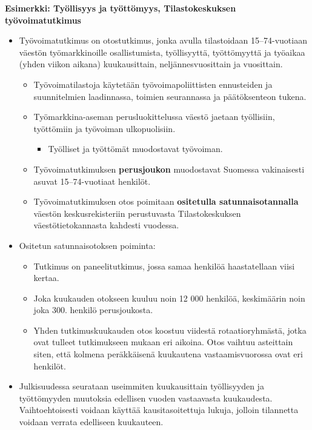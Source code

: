 \documentclass[
]{book}
\providecommand{\tightlist}{%
  \setlength{\itemsep}{0pt}\setlength{\parskip}{0pt}}
\begin{document}
\begin{eblock}{}

\textbf{Esimerkki: Työllisyys ja työttömyys, Tilastokeskuksen työvoimatutkimus}

\begin{itemize}
\tightlist
\item
  Työvoimatutkimus on otostutkimus, jonka avulla tilastoidaan 15--74-vuotiaan väestön työmarkkinoille osallistumista, työllisyyttä, työttömyyttä ja työaikaa (yhden viikon aikana) kuukausittain, neljännesvuosittain ja vuosittain.

  \begin{itemize}
  \tightlist
  \item
    Työvoimatilastoja käytetään työvoimapoliittisten ennusteiden ja suunnitelmien laadinnassa, toimien seurannassa ja päätöksenteon tukena.
  \item
    Työmarkkina-aseman perusluokittelussa väestö jaetaan työllisiin, työttömiin ja työvoiman ulkopuolisiin.

    \begin{itemize}
    \tightlist
    \item
      Työlliset ja työttömät muodostavat työvoiman.
    \end{itemize}
  \item
    Työvoimatutkimuksen \textbf{perusjoukon} muodostavat Suomessa vakinaisesti asuvat 15--74-vuotiaat henkilöt.
  \item
    Työvoimatutkimuksen otos poimitaan \textbf{ositetulla satunnaisotannalla} väestön keskusrekisteriin perustuvasta Tilastokeskuksen väestötietokannasta kahdesti vuodessa.
  \end{itemize}
\item
  Ositetun satunnaisotoksen poiminta:

  \begin{itemize}
  \tightlist
  \item
    Tutkimus on paneelitutkimus, jossa samaa henkilöä haastatellaan viisi kertaa.
  \item
    Joka kuukauden otokseen kuuluu noin 12 000 henkilöä, keskimäärin noin joka 300. henkilö perusjoukosta.
  \item
    Yhden tutkimuskuukauden otos koostuu viidestä rotaatioryhmästä, jotka ovat tulleet tutkimukseen mukaan eri aikoina. Otos vaihtuu asteittain siten, että kolmena peräkkäisenä kuukautena vastaamisvuorossa ovat eri henkilöt.
  \end{itemize}
\item
  Julkisuudessa seurataan useimmiten kuukausittain työllisyyden ja työttömyyden muutoksia edellisen vuoden vastaavasta kuukaudesta. Vaihtoehtoisesti voidaan käyttää kausitasoitettuja lukuja, jolloin tilannetta voidaan verrata edelliseen kuukauteen.
\end{itemize}

\end{eblock}
\end{document}
